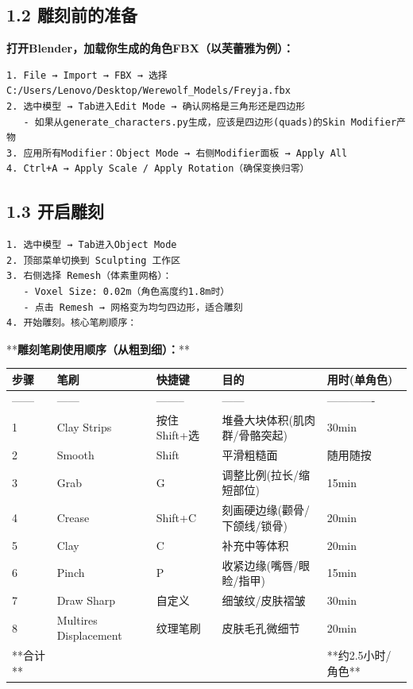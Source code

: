 \documentclass[12pt,a4paper,openany]{ctexbook}
\begin{document}
\subsection*{1.2 雕刻前的准备}


\textbf{打开Blender，加载你生成的角色FBX（以芙蕾雅为例）：}


\begin{verbatim}
1. File → Import → FBX → 选择 C:/Users/Lenovo/Desktop/Werewolf_Models/Freyja.fbx
2. 选中模型 → Tab进入Edit Mode → 确认网格是三角形还是四边形
   - 如果从generate_characters.py生成，应该是四边形(quads)的Skin Modifier产物
3. 应用所有Modifier：Object Mode → 右侧Modifier面板 → Apply All
4. Ctrl+A → Apply Scale / Apply Rotation（确保变换归零）
\end{verbatim}


\subsection*{1.3 开启雕刻}


\begin{verbatim}
1. 选中模型 → Tab进入Object Mode
2. 顶部菜单切换到 Sculpting 工作区
3. 右侧选择 Remesh（体素重网格）：
   - Voxel Size: 0.02m（角色高度约1.8m时）
   - 点击 Remesh → 网格变为均匀四边形，适合雕刻
4. 开始雕刻。核心笔刷顺序：
\end{verbatim}


**\textbf{雕刻笔刷使用顺序（从粗到细）：}**


\begin{tabular}{|l|l|l|l|l|}
\hline
步骤 & 笔刷 & 快捷键 & 目的 & 用时(单角色) \\
\hline
------ & ------ & -------- & ------ & ------------- \\
1 & Clay Strips & 按住Shift+选 & 堆叠大块体积(肌肉群/骨骼突起) & 30min \\
2 & Smooth & Shift & 平滑粗糙面 & 随用随按 \\
3 & Grab & G & 调整比例(拉长/缩短部位) & 15min \\
4 & Crease & Shift+C & 刻画硬边缘(颧骨/下颌线/锁骨) & 20min \\
5 & Clay & C & 补充中等体积 & 20min \\
6 & Pinch & P & 收紧边缘(嘴唇/眼睑/指甲) & 15min \\
7 & Draw Sharp & 自定义 & 细皱纹/皮肤褶皱 & 30min \\
8 & Multires Displacement & 纹理笔刷 & 皮肤毛孔微细节 & 20min \\
**合计** &  &  &  & **约2.5小时/角色** \\
\hline
\end{tabular}
\end{document}
